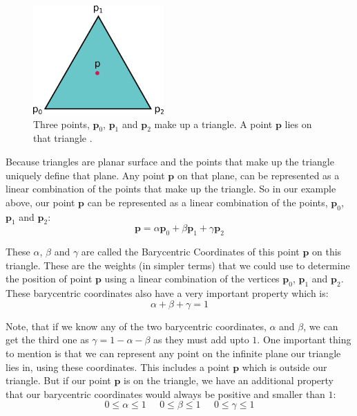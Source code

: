 \documentclass[11pt,a4paper]{article}
\begin{document}
	\begin{figure}[H]
		\centering
		\includegraphics[width=5cm]{triangle.png}
		\caption{\centering Three points, $\boldsymbol{p}_{0}$, $\boldsymbol{p}_{1}$ and $\boldsymbol{p}_{2}$ make up a triangle. A point $\boldsymbol{p}$ lies on that triangle \protect\cite{trianglemeshes}.}
	\end{figure}
	
	\noindent
	Because triangles are planar surface and the points that make up the triangle uniquely define that plane. Any point $\boldsymbol{p}$ on that plane, can be represented as a linear combination of the points that make up the triangle. So in our example above, our point $\boldsymbol{p}$ can be represented as a linear combination of the points, $\boldsymbol{p}_{0}$, $\boldsymbol{p}_{1}$ and $\boldsymbol{p}_{2}$:
	\begin{equation}
	\boldsymbol{p} = \alpha \boldsymbol{p}_{0} + \beta \boldsymbol{p}_{1} + \gamma \boldsymbol{p}_{2}
	\end{equation}
	
	\noindent
	These $\alpha$, $\beta$ and $\gamma$ are called the Barycentric Coordinates of this point $\boldsymbol{p}$ on this triangle. These are the weights (in simpler terms) that we could use to determine the position of point $\boldsymbol{p}$ using a linear combination of the vertices $\boldsymbol{p}_{0}$, $\boldsymbol{p}_{1}$ and $\boldsymbol{p}_{2}$. These barycentric coordinates also have a very important property which is:
	\begin{equation}
	\alpha + \beta + \gamma = 1
	\end{equation}
	
	\noindent
	Note, that if we know any of the two barycentric coordinates, $\alpha$ and $\beta$, we can get the third one as $\gamma = 1 - \alpha - \beta$ as they must add upto $1$. One important thing to mention is that we can represent any point on the infinite plane our triangle lies in, using these coordinates. This includes a point $\boldsymbol{p}$ which is outside our triangle. But if our point $\boldsymbol{p}$ is on the triangle, we have an additional property that our barycentric coordinates would always be positive and smaller than $1$:
	\begin{equation}
	0 \le \alpha \le 1 \;\;\;\;\; 0 \le \beta \le 1 \;\;\;\;\; 0 \le \gamma \le 1
	\end{equation}
	
\end{document}
